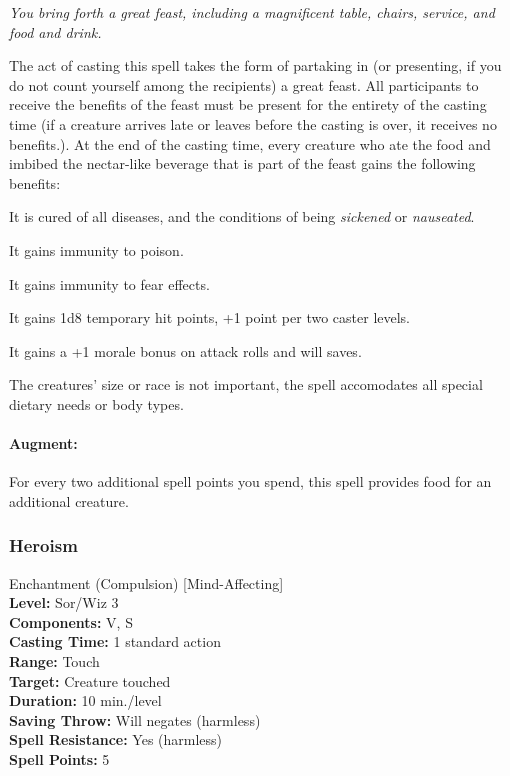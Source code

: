 \emph{You bring forth a great feast, including a magnificent table, chairs, service, and food and drink.}

The act of casting this spell takes the form of partaking in (or presenting, if you do not count yourself among the recipients) a great feast. 
All participants to receive the benefits of the feast must be present for the entirety of the casting time (if a creature arrives late or leaves before the casting is over, it receives no benefits.).
At the end of the casting time, every creature who ate the food and imbibed the nectar-like beverage that is part of the feast gains the following benefits:
\begin{list}{}{\leftmargin=1em}
 \item It is cured of all diseases, and the conditions of being \emph{sickened} or \emph{nauseated}.
 \item It gains immunity to poison.
 \item It gains immunity to fear effects.
 \item It gains 1d8 temporary hit points, +1 point per two caster levels.
 \item It gains a +1 morale bonus on attack rolls and will saves.
\end{list}
The creatures' size or race is not important, the spell accomodates all special dietary needs or body types.

\paragraph{Augment:} For every two additional spell points you spend, this spell provides food for an additional creature.
\subsubsection{Heroism}
\label{Spell:Heroism}
Enchantment (Compulsion) [Mind-Affecting]
\\ \textbf{Level:} Sor/Wiz 3
\\ \textbf{Components:} V, S
\\ \textbf{Casting Time:} 1 standard action
\\ \textbf{Range:} Touch
\\ \textbf{Target:} Creature touched
\\ \textbf{Duration:} 10 min./level
\\ \textbf{Saving Throw:} Will negates (harmless)
\\ \textbf{Spell Resistance:} Yes (harmless)
\\ \textbf{Spell Points:} 5


